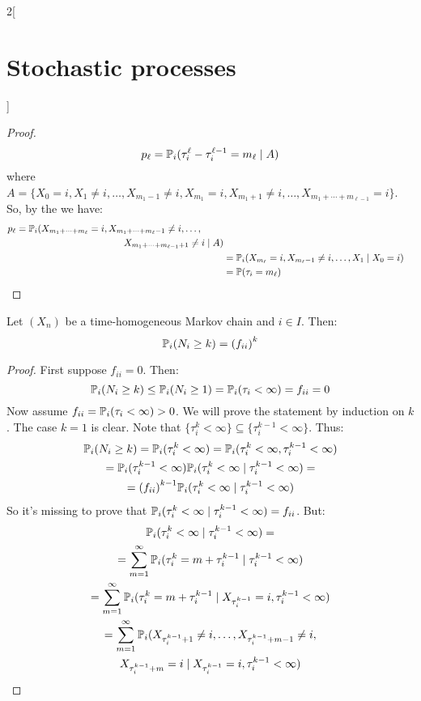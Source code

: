 \documentclass[../../../main_math.tex]{subfiles}
\begin{document}
\begin{multicols}{2}[\section{Stochastic processes}]
\begin{proof}
\begin{equation*}
      p_\ell=\mathbb{P}_i(\tau_i^{\ell}-\tau_i^{\ell-1}=m_\ell\mid A)
    \end{equation*}
    where $A=\{X_0=i,X_1\ne i, \ldots, X_{m_1-1}\ne i,X_{m_1}=i, X_{m_1+1}\ne i,\ldots, X_{m_1+\cdots+m_{\ell-1}}=i\}$. So, by the  we have:
    \begin{align*}
      \begin{split}
        p_\ell&=\Prob_i(X_{m_1+\cdots+m_\ell}=i,X_{m_1+\cdots+m_\ell-1}\ne i,\ldots,\\
        &\hspace{4cm}X_{m_1+\cdots+m_{\ell-1}+1}\ne i\mid A)
      \end{split} \\
       & =\Prob_i(X_{m_\ell}=i,X_{m_\ell-1}\ne i,\ldots,X_{1}\mid X_{0}=i)          \\
       & =\Prob(\tau_i=m_\ell)
    \end{align*}
  \end{proof}
  \begin{proposition}\label{SP:recurrence}
    Let $(X_n)$ be a time-homogeneous Markov chain and $i\in I$. Then:
    $$
      \mathbb{P}_i(N_i\geq k)={(f_{ii})}^k
    $$
  \end{proposition}
  \begin{proof}
    First suppose $f_{ii}=0$. Then:
    $$
      \mathbb{P}_i(N_i\geq k)\leq\mathbb{P}_i(N_i\geq 1)=\mathbb{P}_i(\tau_i<\infty)=f_{ii}=0
    $$
    Now assume $f_{ii}=\mathbb{P}_i(\tau_i<\infty)>0$. We will prove the statement by induction on $k$. The case $k=1$ is clear. Note that $\{\tau_i^k<\infty\}\subseteq \{\tau_i^{k-1}<\infty\}$. Thus:
    \begin{multline*}
      \mathbb{P}_i(N_i\geq k) =\mathbb{P}_i(\tau_i^k<\infty)=\mathbb{P}_i(\tau_i^k<\infty,\tau_i^{k-1}<\infty)\\=\mathbb{P}_i(\tau_i^{k-1}<\infty)\mathbb{P}_i(\tau_i^k<\infty\mid\tau_i^{k-1}<\infty)=\\={(f_{ii})}^{k-1}\mathbb{P}_i(\tau_i^k<\infty\mid\tau_i^{k-1}<\infty)
    \end{multline*}
    So it's missing to prove that $\mathbb{P}_i(\tau_i^k<\infty\mid\tau_i^{k-1}<\infty)={f_{ii}}$. But:
    \begin{multline*}
      \Prob_i(\tau_i^k<\infty\mid\tau_i^{k-1}<\infty)=\\=\sum_{m=1}^{\infty}\Prob_i(\tau_i^k=m+\tau_i^{k-1}\mid\tau_i^{k-1}<\infty)\\=\sum_{m=1}^{\infty}\Prob_i(\tau_i^k=m+\tau_i^{k-1}\mid X_{\tau_i^{k-1}}=i,\tau_i^{k-1}<\infty)
      \\=\sum_{m=1}^{\infty}\Prob_i( X_{\tau_i^{k-1}+1}\ne i,\ldots,X_{\tau_i^{k-1}+m-1}\ne i,\\X_{\tau_i^{k-1}+m}=i\mid X_{\tau_i^{k-1}}=i,\tau_i^{k-1}<\infty)

\end{multline*}
\end{proof}
\end{multicols}
\end{document}
